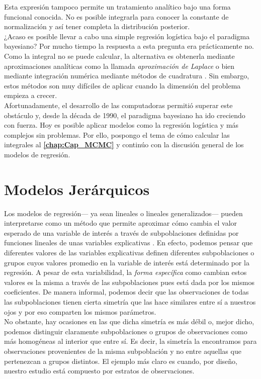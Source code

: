 Esta expresión tampoco permite un tratamiento analítico bajo una forma funcional conocida. No es posible integrarla para conocer la constante de normalización y así tener completa la distribución posterior.\\

¿Acaso es posible llevar a cabo una simple regresión logística bajo el paradigma bayesiano? Por mucho tiempo la respuesta a esta pregunta era prácticamente no. Como la integral no se puede calcular, la alternativa es obtenerla mediante aproximaciones analíticas como la llamada \textit{aproximación de Laplace} o bien mediante integración numérica mediante métodos de cuadratura \parencites{Nieto16,GP97}. Sin embargo, estos métodos son muy difíciles de aplicar cuando la dimensión del problema empieza a crecer.\\ 

Afortunadamente, el desarrollo de las computadoras permitió superar este obstáculo y, desde la década de 1990, el paradigma bayesiano ha ido creciendo con fuerza. Hoy es posible aplicar modelos como la regresión logística y más complejos sin problemas. Por ello, pospongo el tema de cómo calcular las integrales al \textbf{\autoref{chap:Cap_MCMC}} y continúo con la discusión general de los modelos de regresión. 

\section{Modelos Jerárquicos}

Los modelos de regresión--- ya sean lineales o lineales generalizados--- pueden interpretarse como un método que permite aproximar cómo cambia el valor esperado de una variable de interés a través de subpoblaciones definidas por funciones lineales de unas variables explicativas \parencite{GelmanHill06}. En efecto, podemos pensar que diferentes valores de las variables explicativas definen diferentes subpoblaciones o grupos cuyos valores promedio en la variable de interés está determinado por la regresión. A pesar de esta variabilidad, la \textit{forma específica} como cambian estos valores es la misma a través de las subpoblaciones pues está dada por los mismos coeficientes. De manera informal, podemos decir que las observaciones de todas las subpoblaciones tienen cierta simetría que las hace similares entre sí a nuestros ojos y por eso comparten los mismos parámetros.\\ 

No obstante, hay ocasiones en las que dicha simetría es más débil o, mejor dicho, podemos distinguir claramente subpoblaciones o grupos de observaciones como más homogéneas al interior que entre sí. Es decir, la simetría la encontramos para observaciones provenientes de la misma subpoblación y no entre aquellas que pertenezcan a grupos distintos. El ejemplo más claro es cuando, por diseño, nuestro estudio está compuesto por estratos de observaciones.\\ 

